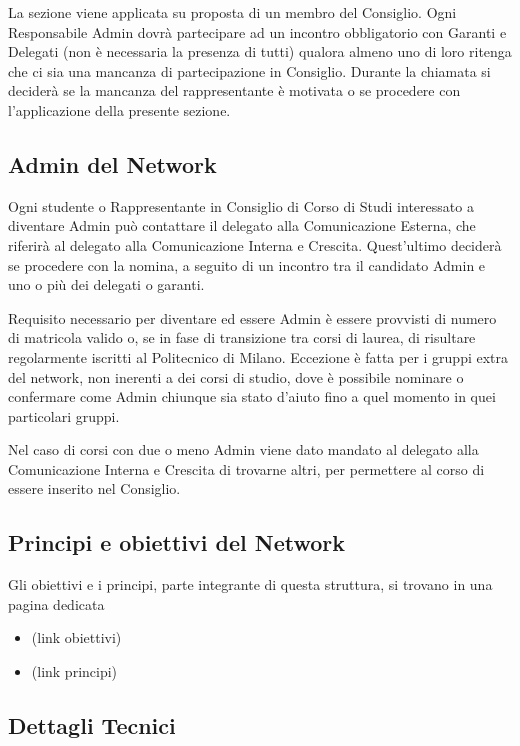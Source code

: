La sezione viene applicata su proposta di un membro del Consiglio.
Ogni Responsabile Admin dovrà partecipare ad un incontro obbligatorio con Garanti e Delegati (non è necessaria la presenza di tutti) qualora almeno uno di loro ritenga che ci sia una mancanza di partecipazione in Consiglio. Durante la chiamata si deciderà se la mancanza del rappresentante è motivata o se procedere con l'applicazione della presente sezione.



\subsection{Admin del Network}

Ogni studente o Rappresentante in Consiglio di Corso di Studi interessato a diventare Admin può contattare il delegato alla Comunicazione Esterna, che riferirà al delegato alla Comunicazione Interna e Crescita. Quest'ultimo deciderà se procedere con la nomina, a seguito di un incontro tra il candidato Admin e uno o più dei delegati o garanti.

Requisito necessario per diventare ed essere Admin è essere provvisti di numero di matricola valido o, se in fase di transizione tra corsi di laurea, di risultare regolarmente iscritti al Politecnico di Milano. Eccezione è fatta per i gruppi extra del network, non inerenti a dei corsi di studio, dove è possibile nominare o confermare come Admin chiunque sia stato d'aiuto fino a quel momento in quei particolari gruppi.


Nel caso di corsi con due o meno Admin viene dato mandato al delegato alla Comunicazione Interna e Crescita di trovarne altri, per permettere al corso di essere inserito nel Consiglio.



\subsection{Principi e obiettivi del Network}

Gli obiettivi e i principi, parte integrante di questa struttura, si trovano in una pagina dedicata
\begin{itemize}


\item (link obiettivi)
\item (link principi)
\end{itemize}


\subsection{Dettagli Tecnici}

